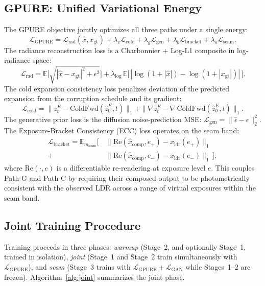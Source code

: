 \documentclass[10pt,twocolumn,letterpaper]{article}
\newcommand{\Lrad}{\mathcal{L}_{\mathrm{rad}}}
\newcommand{\Lcold}{\mathcal{L}_{\mathrm{cold}}}
\newcommand{\Lgen}{\mathcal{L}_{\mathrm{gen}}}
\newcommand{\Lbracket}{\mathcal{L}_{\mathrm{bracket}}}
\newcommand{\Lseam}{\mathcal{L}_{\mathrm{seam}}}
\newcommand{\Lgpure}{\mathcal{L}_{\mathrm{GPURE}}}
\newcommand{\xldr}{x_{\mathrm{ldr}}}
\begin{document}
\subsection{GPURE: Unified Variational Energy}

The GPURE objective jointly optimizes all three paths under a single energy:
\begin{equation}
\Lgpure = \Lrad(\hat x, x_{\mathrm{gt}}) + \lambda_c \Lcold + \lambda_g \Lgen + \lambda_b \Lbracket + \lambda_s \Lseam.
\label{eq:gpure}
\end{equation}
The radiance reconstruction loss is a Charbonnier + Log-L1 composite in log-radiance space:
\begin{equation}
\Lrad = \mathbb{E}\big[\sqrt{|\hat x - x_{\mathrm{gt}}|^2 + \epsilon^2}\big] + \lambda_{\log}\,\mathbb{E}\big[\,|\log(1{+}|\hat x|) - \log(1{+}|x_{\mathrm{gt}}|)|\,\big].
\label{eq:lrad}
\end{equation}
The cold expansion consistency loss penalizes deviation of the predicted expansion from the corruption schedule and its gradient:
\begin{equation}
\Lcold = \|z_t^E - \mathrm{ColdFwd}(\hat z_0^E, t)\|_1 + \|\nabla z_t^E - \nabla\,\mathrm{ColdFwd}(\hat z_0^E, t)\|_1.
\label{eq:lcold}
\end{equation}
The generative prior loss is the diffusion noise-prediction MSE: $\Lgen = \|\hat\epsilon - \epsilon\|_2^2$. The Exposure-Bracket Consistency (ECC) loss operates on the seam band:
\begin{equation}
\begin{split}
\Lbracket = \mathbb{E}_{m_{\mathrm{seam}}}\big[\, &\|\mathrm{Re}(\hat x_{\mathrm{comp}}, e_+) - \xldr(e_+)\|_1 \\
+\ &\|\mathrm{Re}(\hat x_{\mathrm{comp}}, e_-) - \xldr(e_-)\|_1 \,\big],
\end{split}
\label{eq:ecc}
\end{equation}
where $\mathrm{Re}(\cdot, e)$ is a differentiable re-rendering at exposure level $e$. This couples Path-G and Path-C by requiring their composed output to be photometrically consistent with the observed LDR across a range of virtual exposures within the seam band.

\subsection{Joint Training Procedure}

Training proceeds in three phases: \emph{warmup} (Stage~2, and optionally Stage~1, trained in isolation), \emph{joint} (Stage~1 and Stage~2 train simultaneously with $\Lgpure$), and \emph{seam} (Stage~3 trains with $\Lgpure + \mathcal{L}_{\mathrm{GAN}}$ while Stages~1--2 are frozen). Algorithm~\ref{alg:joint} summarizes the joint phase.
\end{document}
